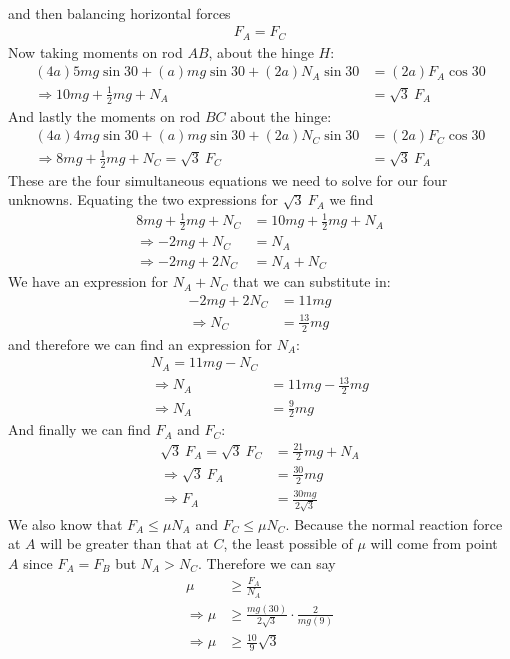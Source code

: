 \begin{problem}[A1986FMIIQ3l]
{\begin{align*}
\end{align*}
and then balancing horizontal forces
\begin{align*}
F_A=F_C
\end{align*}
Now taking moments on rod $AB$, about the hinge $H$:
\begin{align*}
(4a)5mg\sin{30}+(a)mg\sin{30}+(2a)N_A\sin{30}&=(2a)F_A\cos{30} \\
\Rightarrow 10mg+\frac{1}{2}mg+N_A&=\sqrt 3\: F_A
\end{align*}
And lastly the moments on rod $BC$ about the hinge:
\begin{align*}
(4a)4mg\sin{30}+(a)mg\sin{30}+(2a)N_C\sin{30}&=(2a)F_C\cos{30} \\
\Rightarrow 8mg+\frac{1}{2}mg+N_C=\sqrt 3 \: F_C&=\sqrt 3\: F_A
\end{align*}
These are the four simultaneous equations we need to solve for our four unknowns. Equating the two expressions for $\sqrt 3 \: F_A$ we find
\begin{align*}
 8mg+\frac{1}{2}mg+N_C&=10mg+\frac{1}{2}mg+N_A \\
\Rightarrow -2mg+N_C&=N_A \\
\Rightarrow -2mg+2N_C&=N_A+N_C  
\end{align*}
We have an expression for $N_A+N_C$ that we can substitute in:
\begin{align*}
-2mg+2N_C&=11mg \\
\Rightarrow N_C&=\frac{13}{2}mg
\end{align*}
and therefore we can find an expression for $N_A$:
\begin{align*}
N_A=11mg-N_C \\
\Rightarrow N_A&=11mg-\frac{13}{2}mg \\
\Rightarrow N_A&=\frac{9}{2}mg
\end{align*}
And finally we can find $F_A$ and $F_C$:
\begin{align*}
\sqrt 3 \: F_A=\sqrt 3 \: F_C&=\frac{21}{2}mg+N_A \\
\Rightarrow \sqrt 3 \: F_A&=\frac{30}{2}mg\\
\Rightarrow F_A&=\frac{30mg}{2\sqrt3}
\end{align*}
We also know that $F_A\le\mu N_A$ and $F_C\le \mu N_C$. Because the normal reaction force at $A$ will be greater than that at $C$, the least possible of $\mu$ will come from point $A$ since $F_A=F_B$ but $N_A>N_C$. Therefore we can say 
\begin{align*}
\mu&\ge\frac{F_A}{N_A} \\
\Rightarrow \mu&\ge\frac{mg(30)}{2\sqrt 3}\cdot\frac{2}{mg(9)} \\
\Rightarrow \mu&\ge\frac{10}{9}\sqrt 3
\end{align*} 
}
\end{problem}